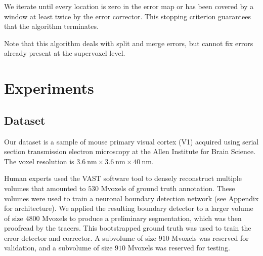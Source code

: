 \documentclass{article}
\begin{document}
We iterate until every location is zero in the error map or has been covered by a window at least twice by the error corrector. This stopping criterion guarantees that the algorithm terminates.

Note that this algorithm deals with split and merge errors, but cannot fix errors already present at the supervoxel level.



\section{Experiments}
\subsection{Dataset}


Our dataset is a sample of mouse primary visual cortex (V1) acquired using serial section transmission electron microscopy at the Allen Institute for Brain Science. The voxel resolution is $3.6~\text{nm} \times 3.6~\text{nm} \times 40~\text{nm}$.

Human experts used the VAST software tool \cite{kasthuri2015saturated, VAST} to densely reconstruct multiple volumes that amounted to $530$ Mvoxels of ground truth annotation. These volumes were used to train a neuronal boundary detection network (see Appendix for architecture). We applied the resulting boundary detector to a larger volume of size $4800$ Mvoxels to produce a preliminary segmentation, which was then proofread by the tracers. This bootstrapped ground truth was used to train the error detector and corrector. A subvolume of size $910$ Mvoxels was reserved for validation, and a subvolume of size $910$ Mvoxels was reserved for testing.
\end{document}

